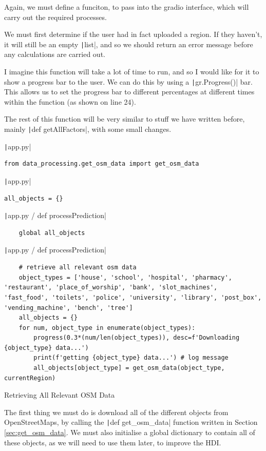 \documentclass[12pt]{report}
\newcommand{\pil}[1]{\protect\texttt|#1|}
\begin{document}
Again, we must define a funciton, to pass into the gradio interface, which will carry out the required processes.

We must first determine if the user had in fact uploaded a region. If they haven't, it will still be an empty \pil{list}, and so we should return an error message before any calculations are carried out.

I imagine this function will take a lot of time to run, and so I would like for it to show a progress bar to the user. We can do this by using a \pil{gr.Progress()} bar. This allows us to set the progress bar to different percentages at different times within the function (as shown on line 24).

The rest of this function will be very similar to stuff we have written before, mainly \pil{def getAllFactors}, with some small changes.

\begin{listing}[H]
\pil{app.py}
\begin{verbatim}
from data_processing.get_osm_data import get_osm_data
\end{verbatim}
\pil{app.py}
\begin{verbatim}
all_objects = {}
\end{verbatim}
\pil{app.py / def processPrediction}
\begin{verbatim}
    global all_objects
\end{verbatim}
\pil{app.py / def processPrediction}
\begin{verbatim}
    # retrieve all relevant osm data
    object_types = ['house', 'school', 'hospital', 'pharmacy', 'restaurant', 'place_of_worship', 'bank', 'slot_machines', 'fast_food', 'toilets', 'police', 'university', 'library', 'post_box', 'vending_machine', 'bench', 'tree']
    all_objects = {}
    for num, object_type in enumerate(object_types):
        progress(0.3*(num/len(object_types)), desc=f'Downloading {object_type} data...')
        print(f'getting {object_type} data...') # log message
        all_objects[object_type] = get_osm_data(object_type, currentRegion)
\end{verbatim}
\caption{Retrieving All Relevant OSM Data}\label{cs:retrieveOSMdata}
\end{listing}

The first thing we must do is download all of the different objects from OpenStreetMaps, by calling the \pil{def get_osm_data} function written in Section \ref{sec:get_osm_data}. We must also initialise a global dictionary to contain all of these objects, as we will need to use them later, to improve the HDI.
\end{document}
